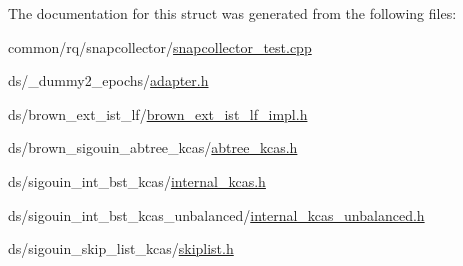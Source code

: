 The documentation for this struct was generated from the following files\+:\begin{DoxyCompactItemize}
\item 
common/rq/snapcollector/\hyperlink{snapcollector__test_8cpp}{snapcollector\+\_\+test.\+cpp}\item 
ds/\+\_\+dummy2\+\_\+epochs/\hyperlink{__dummy2__epochs_2adapter_8h}{adapter.\+h}\item 
ds/brown\+\_\+ext\+\_\+ist\+\_\+lf/\hyperlink{brown__ext__ist__lf__impl_8h}{brown\+\_\+ext\+\_\+ist\+\_\+lf\+\_\+impl.\+h}\item 
ds/brown\+\_\+sigouin\+\_\+abtree\+\_\+kcas/\hyperlink{abtree__kcas_8h}{abtree\+\_\+kcas.\+h}\item 
ds/sigouin\+\_\+int\+\_\+bst\+\_\+kcas/\hyperlink{internal__kcas_8h}{internal\+\_\+kcas.\+h}\item 
ds/sigouin\+\_\+int\+\_\+bst\+\_\+kcas\+\_\+unbalanced/\hyperlink{internal__kcas__unbalanced_8h}{internal\+\_\+kcas\+\_\+unbalanced.\+h}\item 
ds/sigouin\+\_\+skip\+\_\+list\+\_\+kcas/\hyperlink{skiplist_8h}{skiplist.\+h}\end{DoxyCompactItemize}
